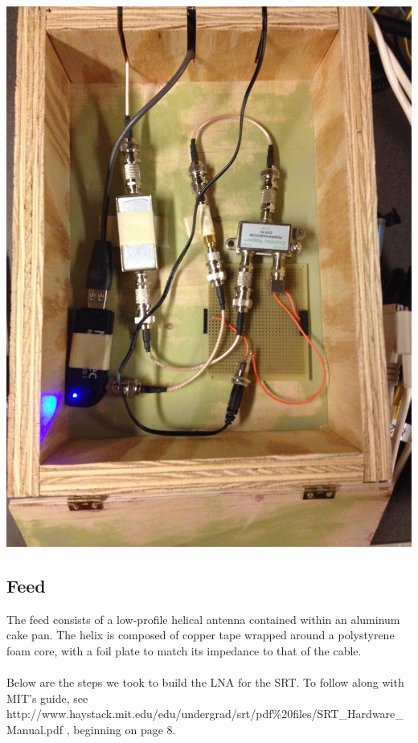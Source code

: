 \documentclass[11pt]{article} %
\begin{document}
\begin{center}
\includegraphics[scale=0.20]{lnainterface/06.jpeg}
\end{center}



\subsection{Feed}

The feed consists of a low-profile helical antenna contained within an aluminum cake pan. The helix is composed of copper tape wrapped around a polystyrene foam core, with a foil plate to match its impedance to that of the cable.
\\ \\
Below are the steps we took to build the LNA for the SRT. To follow along with MIT's guide, see http://www.haystack.mit.edu/edu/undergrad/srt/pdf\%20files/SRT\_Hardware\_Manual.pdf , beginning on page 8.
\end{document}
